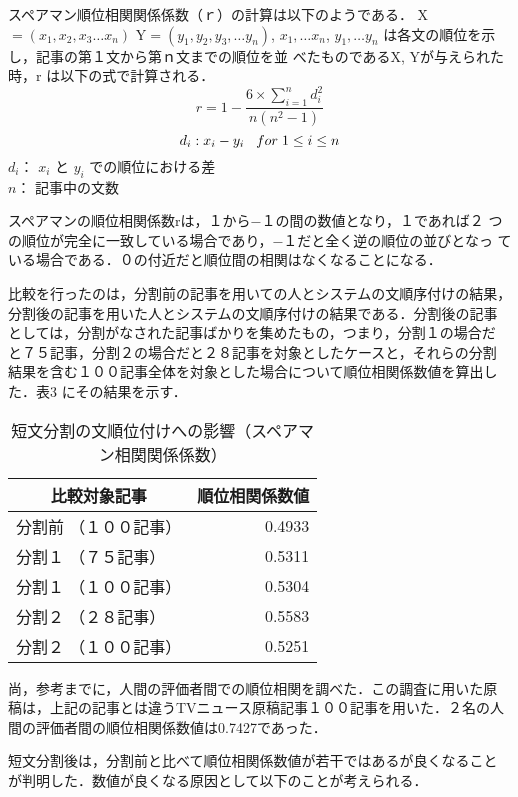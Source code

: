 スペアマン順位相関関係係数（ｒ）の計算は以下のようである．
X$=(x_1,x_2,x_3\ldots x_n)$  Y$=(y_1,y_2,y_3,\ldots y_n)$,  $x_1,\ldots x_n$,
$y_1,\ldots y_n$ は各文の順位を示し，記事の第１文から第ｎ文までの順位を並
べたものであるX, Yが与えられた時，r は以下の式で計算される．
{\large
$$r=1-\frac{{\displaystyle 6\times\sum_{i=1}^n d_i^2}}{n(n^2-1)}$$
$$d_i:x_i-y_i \hspace{3mm} for \hspace{1mm} 1\leq i \leq n$$}
\noindent
$d_i$： $x_i$ と $y_i$ での順位における差\\
\hspace*{2mm}$n$： 記事中の文数

スペアマンの順位相関係数rは，１から−１の間の数値となり，１であれば２
つの順位が完全に一致している場合であり，−１だと全く逆の順位の並びとなっ
ている場合である．０の付近だと順位間の相関はなくなることになる．

比較を行ったのは，分割前の記事を用いての人とシステムの文順序付けの結果，
分割後の記事を用いた人とシステムの文順序付けの結果である．分割後の記事
としては，分割がなされた記事ばかりを集めたもの，つまり，分割１の場合だ
と７５記事，分割２の場合だと２８記事を対象としたケースと，それらの分割
結果を含む１００記事全体を対象とした場合について順位相関係数値を算出し
た．表3 にその結果を示す．

\begin{table}[h]
\begin{center}
\begin{tabular}{|l|r|} \hline
\multicolumn{1}{|c|}{比較対象記事} & \multicolumn{1}{|c|}{順位相関係数値}\\ \hline
分割前 （１００記事） & 0.4933\\ \hline
分割１ （７５記事）   & 0.5311\\ \hline
分割１ （１００記事） & 0.5304\\ \hline
分割２ （２８記事）   & 0.5583\\ \hline
分割２ （１００記事） & 0.5251\\ \hline
\end{tabular}
\end{center}
\caption{短文分割の文順位付けへの影響（スペアマン相関関係係数）}
\end{table}

尚，参考までに，人間の評価者間での順位相関を調べた．この調査に用いた原
稿は，上記の記事とは違うTVニュース原稿記事１００記事を用いた．２名の人
間の評価者間の順位相関係数値は0.7427であった．

短文分割後は，分割前と比べて順位相関係数値が若干ではあるが良くなること
が判明した．数値が良くなる原因として以下のことが考えられる．

